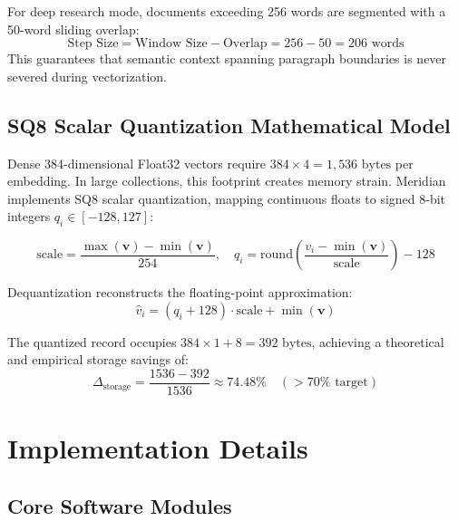 \documentclass{tietreport}
\begin{document}
For deep research mode, documents exceeding 256 words are segmented with a 50-word sliding overlap:
\begin{equation}
\text{Step Size} = \text{Window Size} - \text{Overlap} = 256 - 50 = 206 \text{ words}
\end{equation}
This guarantees that semantic context spanning paragraph boundaries is never severed during vectorization.

\section{SQ8 Scalar Quantization Mathematical Model}

Dense 384-dimensional Float32 vectors require $384 \times 4 = 1{,}536\text{ bytes}$ per embedding. In large collections, this footprint creates memory strain. Meridian implements SQ8 scalar quantization, mapping continuous floats to signed 8-bit integers $q_i \in [-128, 127]$:

\begin{equation}
\text{scale} = \frac{\max(\mathbf{v}) - \min(\mathbf{v})}{254}, \quad q_i = \text{round}\left(\frac{v_i - \min(\mathbf{v})}{\text{scale}}\right) - 128
\end{equation}

Dequantization reconstructs the floating-point approximation:
\begin{equation}
\hat{v}_i = (q_i + 128) \cdot \text{scale} + \min(\mathbf{v})
\end{equation}

The quantized record occupies $384 \times 1 + 8 = 392\text{ bytes}$, achieving a theoretical and empirical storage savings of:
\begin{equation}
\Delta_{\text{storage}} = \frac{1536 - 392}{1536} \approx 74.48\% \quad (> 70\% \text{ target})
\end{equation}


\chapter{Implementation Details}

\section{Core Software Modules}
\end{document}

